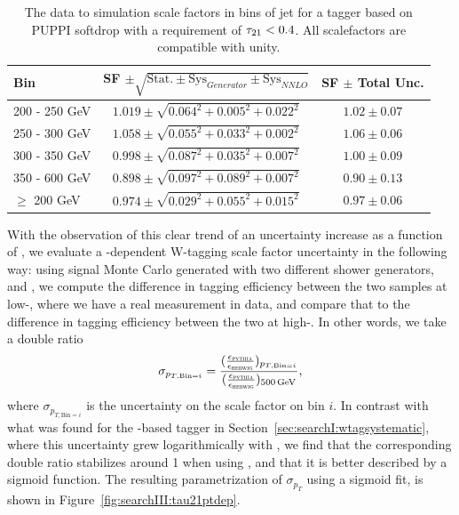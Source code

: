\begin{table}[h!]
    \centering
    \begin{tabular}{|l|c|c|}
    \hline
     Bin & SF $\pm \sqrt{\textrm{Stat.} \pm \textrm{Sys}_{Generator} \pm \textrm{Sys}_{NNLO}}$ & SF $\pm$ Total Unc. \\
\hline
200 - 250 GeV  & $1.019  \pm \sqrt{ 0.064^2 + 0.005^2 + 0.022^2 }$ & $1.02 \pm 0.07$\\
250 - 300 GeV  & $1.058  \pm \sqrt{ 0.055^2 + 0.033^2 + 0.002^2 }$ & $1.06 \pm 0.06$\\
300 - 350 GeV  & $0.998  \pm \sqrt{ 0.087^2 + 0.035^2 + 0.007^2 }$ & $1.00 \pm 0.09$\\
350 - 600 GeV  & $0.898  \pm \sqrt{ 0.097^2 + 0.089^2 + 0.007^2 }$ & $0.90 \pm 0.13$\\
\hline
$\geq$ 200 GeV & $0.974  \pm \sqrt{ 0.029^2 + 0.055^2 + 0.015^2 }$ & $0.97 \pm 0.06$\\
    \hline
    \end{tabular}
    \caption{The data to simulation scale factors in bins of jet \PT for a tagger based on PUPPI softdrop with a requirement of $\tau_{21}<0.4$. All scalefactors are compatible with unity.}
    \label{tab:searchIII:sfptdep}
 \end{table}
With the observation of this clear trend of an uncertainty increase as a function of \PT, we evaluate a \PT-dependent W-tagging scale factor uncertainty in the following way: using signal Monte Carlo generated with two different shower generators,  and \HERWIG{++}, we compute the difference in tagging efficiency between the two samples at low-\PT, where we have a real measurement in data, and compare that to the difference in tagging efficiency between the two at high-\PT. In other words, we take a double ratio 
\begin{equation}
  \sigma_{p_{T,\textrm{Bin}=i}}=\frac{ (\frac{\epsilon_{{\textsc{pythia}}}}{\epsilon_{{\textsc{herwig}}}})_{p_{T,\textrm{Bin}=i}}} {(\frac{\epsilon_{{\textsc{pythia}}}}{\epsilon_{{\textsc{herwig}}}})_{500 \,\text{Ge\hspace{-.08em}V}}},
  \end{equation}
where $\sigma_{p_{T,\textrm{Bin}=i}}$ is the uncertainty on the scale factor on \PT bin $i$. In contrast with what was found for the \nsubj-based tagger in Section~\ref{sec:searchI:wtagsystematic}, where this uncertainty grew logarithmically with \PT, we find that the corresponding double ratio stabilizes around 1 \TeV when using \ddt, and that it is better described by a sigmoid function. The resulting parametrization of $\sigma_{p_{T}}$ using a sigmoid fit, is shown in Figure~\ref{fig:searchIII:tau21ptdep}.
